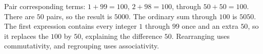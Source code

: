 Pair corresponding terms: $1+99=100$, $2+98=100$, through $50+50=100$. There are $50$ pairs, so the result is $\boxed{5000}$. The ordinary sum through $100$ is $5050$. The first expression contains every integer $1$ through $99$ once and an extra $50$, so it replaces the $100$ by $50$, explaining the difference $50$. Rearranging uses commutativity, and regrouping uses associativity.
